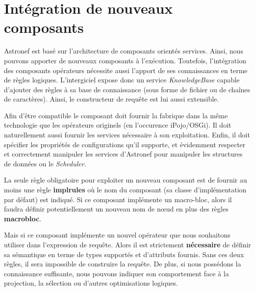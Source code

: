 \section{Intégration de nouveaux composants}\label{sec:contrib:astronef:integration}
Astronef est basé sur l'architecture de composants orientés services. Ainsi, nous pouvons apporter de nouveaux composants à l'exécution. Toutefois, l'intégration des composants opérateurs nécessite aussi l'apport de ses connaissances en terme de règles logiques. L'intergiciel expose donc un service \textit{KnowledgeBase} capable d'ajouter des règles à sa base de connaissance (sous forme de fichier ou de chaînes de caractères). Ainsi, le constructeur de requête est lui aussi extensible.

Afin d'être compatible le composant doit fournir la fabrique dans la même technologie que les opérateurs originels (en l'occurence iPojo/OSGi). Il doit naturellement aussi fournir les services nécessaire à son exploitation. Enfin, il doit spécifier les propriétés de configurations qu'il supporte, et évidemment respecter et correctement manipuler les services d'Astronef pour manipuler les structures de données ou le \textit{Scheduler}.

La seule règle obligatoire pour exploiter un nouveau composant est de fournir au moins une règle \textbf{implrules} où le nom du composant (sa classe d'implémentation par défaut) est indiqué. Si ce composant implémente un macro-bloc, alors il faudra définir potentiellement un nouveau nom de nœud en plus des règles \textbf{macrobloc}.

Mais si ce composant implémente un nouvel opérateur que nous souhaitons utiliser dans l'expression de requête. Alors il est strictement \textbf{nécessaire} de définir sa sémantique en terme de types supportés et d'attributs fournis. Sans ces deux règles, il sera impossible de construire la requête. De plus, si nous possédons la connaissance suffisante, nous pouvons indiquer son comportement face à la projection, la sélection ou d'autres optimisations logiques.
